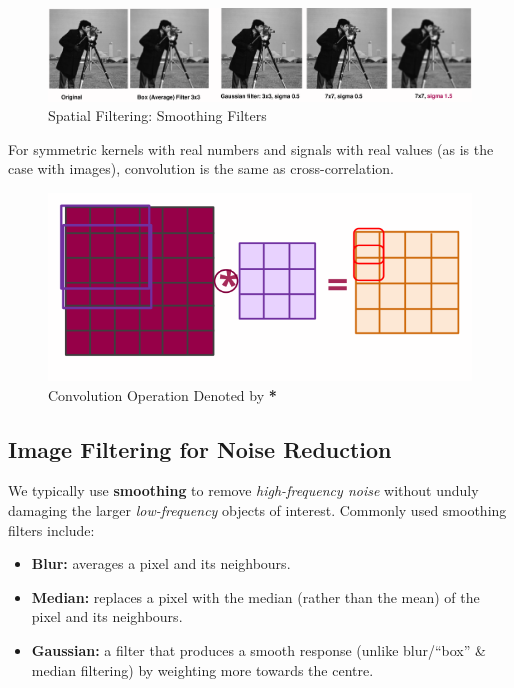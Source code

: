 \documentclass[a4paper,11pt]{article}
\begin{document}
\begin{figure}[H]
    \centering
    \includegraphics[width=\textwidth]{images/spatial_filtering_smoothing_filters.png}
    \caption{Spatial Filtering: Smoothing Filters}
\end{figure}

For symmetric kernels with real numbers and signals with real values (as is the case with images), convolution is the same as cross-correlation.

\begin{figure}[H]
    \centering
    \includegraphics[width=\textwidth]{images/2dconvolutioneg1.png}
    \caption{Convolution Operation Denoted by \textbf{*}}
\end{figure}

\subsection{Image Filtering for Noise Reduction}
We typically use \textbf{smoothing} to remove \textit{high-frequency noise} without unduly damaging the larger \textit{low-frequency} objects of interest.
Commonly used smoothing filters include:
\begin{itemize}
    \item   \textbf{Blur:} averages a pixel and its neighbours.
    \item   \textbf{Median:} replaces a pixel with the median (rather than the mean) of the pixel and its neighbours.
    \item   \textbf{Gaussian:} a filter that produces a smooth response (unlike blur/``box'' \& median filtering) by weighting more towards the centre.
\end{itemize}
\end{document}
